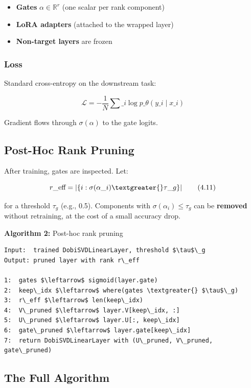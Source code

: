 \begin{itemize}
\item \textbf{Gates} $\alpha \in \mathbb{R}^r$ (one scalar per rank component)
\item \textbf{LoRA adapters} (attached to the wrapped layer)
\item \textbf{Non-target layers} are frozen

\end{itemize}
\subsubsection{Loss}

Standard cross-entropy on the downstream task:

\[
\mathcal{L} = -\frac{1}{N} \sum\_i \log p\_\theta(y\_i \mid x\_i)
\tag{4.10}
\]

Gradient flows through $\sigma(\alpha)$ to the gate logits.

\subsection{Post-Hoc Rank Pruning}

After training, gates are inspected. Let:

\[
r\_\text{eff} = \left|\{i : \sigma(\alpha\_i) \textgreater{} \tau\_g\}\right|
\tag{4.11}
\]

for a threshold $\tau_g$ (e.g., 0.5). Components with $\sigma(\alpha_i) \leq \tau_g$ 
can be \textbf{removed} without retraining, at the cost of a small accuracy drop.

\textbf{Algorithm 2:} Post-hoc rank pruning
\begin{lstlisting}
Input:  trained DobiSVDLinearLayer, threshold $\tau$\_g
Output: pruned layer with rank r\_eff

1:  gates $\leftarrow$ sigmoid(layer.gate)
2:  keep\_idx $\leftarrow$ where(gates \textgreater{} $\tau$\_g)
3:  r\_eff $\leftarrow$ len(keep\_idx)
4:  V\_pruned $\leftarrow$ layer.V[keep\_idx, :]
5:  U\_pruned $\leftarrow$ layer.U[:, keep\_idx]
6:  gate\_pruned $\leftarrow$ layer.gate[keep\_idx]
7:  return DobiSVDLinearLayer with (U\_pruned, V\_pruned, gate\_pruned)
\end{lstlisting}

\subsection{The Full Algorithm}

